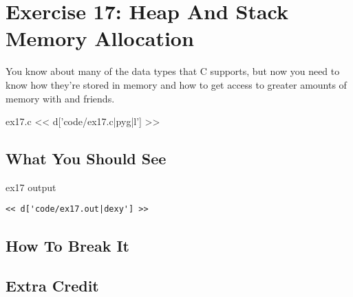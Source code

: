 \chapter{Exercise 17: Heap And Stack Memory Allocation}

You know about many of the data types that C supports, but
now you need to know how they're stored in memory and how to
get access to greater amounts of memory with 
and friends.

\begin{code}{ex17.c}
<< d['code/ex17.c|pyg|l'] >>
\end{code}

\section{What You Should See}

\begin{code}{ex17 output}
\begin{lstlisting}
<< d['code/ex17.out|dexy'] >>
\end{lstlisting}
\end{code}

\section{How To Break It}


\section{Extra Credit}



